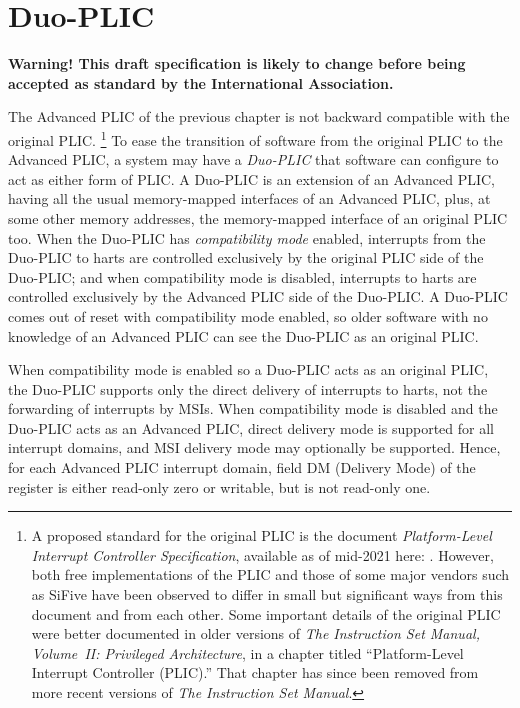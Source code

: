 
\chapter{Duo-PLIC}
\label{ch:DuoPLIC}

\textbf{%
Warning!
This draft specification is likely to change before being accepted as
standard by the {\RISCV} International Association.%
}
\bigskip

The Advanced PLIC of the previous chapter is not backward compatible
with the original {\RISCV} PLIC.%
\footnote{%
A proposed standard for the original PLIC is the document
\textit{{\RISCV} Platform-Level Interrupt Controller Specification},
available as of mid-2021 here:
.
However, both free implementations of the PLIC and those of some major
{\RISCV} vendors such as SiFive have been observed to differ in small
but significant ways from this document and from each other.
Some important details of the original PLIC were better documented in
older versions of
\textit{The {\RISCV} Instruction Set Manual, Volume~II: Privileged
Architecture}, in a chapter titled
``Platform-Level Interrupt Controller (PLIC).''
That chapter has since been removed from more recent versions of
\textit{The {\RISCV} Instruction Set Manual}.%
}
To ease the transition of software from the original PLIC to the
Advanced PLIC, a {\RISCV} system may have a \emph{\mbox{Duo-PLIC\/}}
that software can configure to act as either form of PLIC.
A \mbox{Duo-PLIC} is an extension of an Advanced PLIC, having all the
usual memory-mapped interfaces of an Advanced PLIC, plus, at some other
memory addresses, the memory-mapped interface of an original {\RISCV}
PLIC too.
When the \mbox{Duo-PLIC} has \emph{compatibility mode} enabled,
interrupts from the \mbox{Duo-PLIC} to harts are controlled exclusively
by the original PLIC side of the \mbox{Duo-PLIC};
and when compatibility mode is disabled, interrupts to harts
are controlled exclusively by the Advanced PLIC side of the
\mbox{Duo-PLIC}.
A \mbox{Duo-PLIC} comes out of reset with compatibility mode enabled,
so older software with no knowledge of an Advanced PLIC can see the
\mbox{Duo-PLIC} as an original PLIC.

When compatibility mode is enabled so a \mbox{Duo-PLIC} acts as an
original PLIC, the \mbox{Duo-PLIC} supports only the direct delivery of
interrupts to harts, not the forwarding of interrupts by MSIs.
When compatibility mode is disabled and the \mbox{Duo-PLIC} acts as
an Advanced PLIC, direct delivery mode is supported for all interrupt
domains, and MSI delivery mode may optionally be supported.
Hence, for each Advanced PLIC interrupt domain, field DM
(Delivery Mode) of the  register is either read-only zero
or writable, but is not read-only one.

